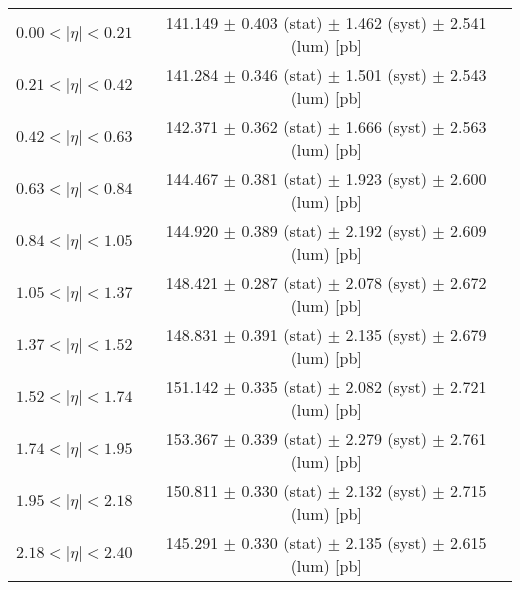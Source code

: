 \begin{tabular}{lc}
\hline
$0.00 < |\eta| <0.21$          & 141.149 $\pm$ 0.403 (stat) $\pm$ 1.462 (syst) $\pm$ 2.541 (lum) [pb]  \\
$0.21 < |\eta| <0.42$          & 141.284 $\pm$ 0.346 (stat) $\pm$ 1.501 (syst) $\pm$ 2.543 (lum) [pb]  \\
$0.42 < |\eta| <0.63$          & 142.371 $\pm$ 0.362 (stat) $\pm$ 1.666 (syst) $\pm$ 2.563 (lum) [pb]  \\
$0.63 < |\eta| <0.84$          & 144.467 $\pm$ 0.381 (stat) $\pm$ 1.923 (syst) $\pm$ 2.600 (lum) [pb]  \\
$0.84 < |\eta| <1.05$          & 144.920 $\pm$ 0.389 (stat) $\pm$ 2.192 (syst) $\pm$ 2.609 (lum) [pb]  \\
$1.05 < |\eta| <1.37$          & 148.421 $\pm$ 0.287 (stat) $\pm$ 2.078 (syst) $\pm$ 2.672 (lum) [pb]  \\
$1.37 < |\eta| <1.52$          & 148.831 $\pm$ 0.391 (stat) $\pm$ 2.135 (syst) $\pm$ 2.679 (lum) [pb]  \\
$1.52 < |\eta| <1.74$          & 151.142 $\pm$ 0.335 (stat) $\pm$ 2.082 (syst) $\pm$ 2.721 (lum) [pb]  \\
$1.74 < |\eta| <1.95$          & 153.367 $\pm$ 0.339 (stat) $\pm$ 2.279 (syst) $\pm$ 2.761 (lum) [pb]  \\
$1.95 < |\eta| <2.18$          & 150.811 $\pm$ 0.330 (stat) $\pm$ 2.132 (syst) $\pm$ 2.715 (lum) [pb]  \\
$2.18 < |\eta| <2.40$          & 145.291 $\pm$ 0.330 (stat) $\pm$ 2.135 (syst) $\pm$ 2.615 (lum) [pb]  \\
\hline
\end{tabular}
